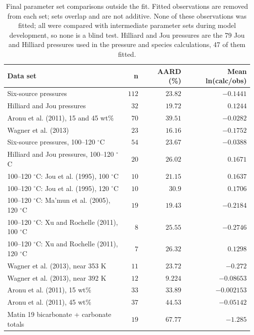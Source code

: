 \begin{table}[!htbp]\small\setlength{\tabcolsep}{3pt}\centering
\caption{Final parameter set comparisons outside the fit. Fitted observations are removed from each set; sets overlap and are not additive. None of these observations was fitted; all were compared with intermediate parameter sets during model development, so none is a blind test. Hilliard and Jou pressures are the 79 Jou and Hilliard pressures used in the pressure and species calculations, 47 of them fitted.}\label{tab:supplement-outside-fit}
\begin{tabular}{@{}lrrr@{}}
\toprule
Data set & n & AARD (\%) & Mean ln(calc/\allowbreak{}obs) \\
\midrule
Six-source pressures & $112$ & $23.82$ & $-0.1441$ \\
Hilliard and Jou pressures & $32$ & $19.72$ & $0.1244$ \\
Aronu et al. (2011), 15 and 45 wt\% & $70$ & $39.51$ & $-0.0282$ \\
Wagner et al. (2013) & $23$ & $16.16$ & $-0.1752$ \\
Six-source pressures, 100--120 $^\circ$C & $54$ & $23.67$ & $-0.0388$ \\
Hilliard and Jou pressures, 100--120 $^\circ$C & $20$ & $26.02$ & $0.1671$ \\
100--120 $^\circ$C: Jou et al. (1995), 100 $^\circ$C & $10$ & $21.15$ & $0.1637$ \\
100--120 $^\circ$C: Jou et al. (1995), 120 $^\circ$C & $10$ & $30.9$ & $0.1706$ \\
100--120 $^\circ$C: Ma’mun et al. (2005), 120 $^\circ$C & $19$ & $19.43$ & $-0.2184$ \\
100--120 $^\circ$C: Xu and Rochelle (2011), 100 $^\circ$C & $8$ & $25.55$ & $-0.2746$ \\
100--120 $^\circ$C: Xu and Rochelle (2011), 120 $^\circ$C & $7$ & $26.32$ & $0.1298$ \\
Wagner et al. (2013), near 353 K & $11$ & $23.72$ & $-0.272$ \\
Wagner et al. (2013), near 392 K & $12$ & $9.224$ & $-0.08653$ \\
Aronu et al. (2011), 15 wt\% & $33$ & $33.89$ & $-0.002153$ \\
Aronu et al. (2011), 45 wt\% & $37$ & $44.53$ & $-0.05142$ \\
Matin 19 bicarbonate + carbonate totals & $19$ & $67.77$ & $-1.285$ \\
\bottomrule
\end{tabular}
\end{table}
